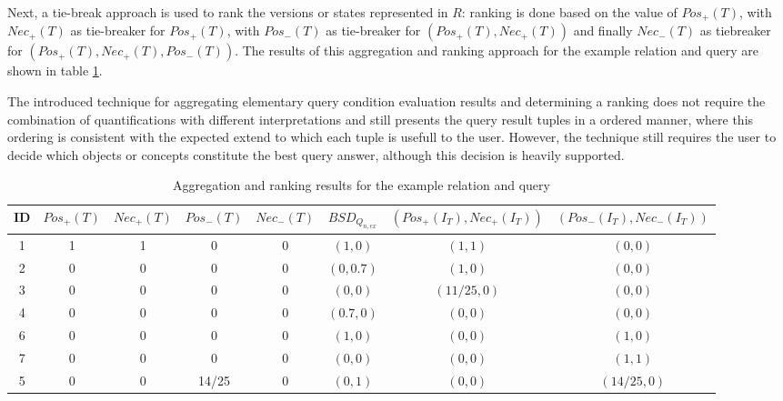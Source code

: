\documentclass[runningheads,a4paper]{llncs}
\begin{document}
Next, a tie-break approach is used to rank the versions or states represented in $R$: ranking is done based on the value of $Pos_{+}(T)$, with $Nec_{+}(T)$ as tie-breaker for $Pos_{+}(T)$, with $Pos_{-}(T)$ as tie-breaker for $(Pos_{+}(T), Nec_{+}(T))$ and finally $Nec_{-}(T)$ as tiebreaker for $(Pos_{+}(T), Nec_{+}(T), Pos_{-}(T))$. The results of this aggregation and ranking approach for the example relation and query are shown in table \ref{tab:ex-ranking}.

The introduced technique for aggregating elementary query condition evaluation results and determining a ranking does not require the combination of quantifications with different interpretations and still presents the query result tuples in a ordered manner, where this ordering is consistent with the expected extend to which each tuple is usefull to the user. However, the technique still requires the user to decide which objects or concepts constitute the best query answer, although this decision is heavily supported.

\vspace{-15pt}
\begin{table}[ht]
\caption{Aggregation and ranking results for the example relation and query}
\centering
\begin{tabular}{|c|c|c|c|c||c|c|c|}
\hline
\textbf{ID} & \textbf{$Pos_{+}(T)$} & \textbf{$Nec_{+}(T)$} & \textbf{$Pos_{-}(T)$} & \textbf{$Nec_{-}(T)$} & \textbf{$BSD_{Q_{n,ex}}$} & \textbf{$(Pos_{+}(I_T), Nec_{+}(I_T))$} & \textbf{$(Pos_{-}(I_T), Nec_{-}(I_T))$} \\
\hline
\hline
1 & 1 & 1 & 0 & 0 & $(1, 0)$ & $(1,1)$ & $(0,0)$ \\
\hline
2 & 0 & 0 & 0 & 0 & $(0, 0.7)$ & $(1,0)$ & $(0,0)$ \\
\hline
3 & 0 & 0 & 0 & 0 & $(0, 0)$ & $(11/25,0)$ & $(0,0)$ \\
\hline
4 & 0 & 0 & 0 & 0 & $(0.7, 0)$ & $(0,0)$ & $(0,0)$ \\
\hline
6 & 0 & 0 & 0 & 0 & $(1, 0)$ & $(0,0)$ & $(1,0)$ \\
\hline
7 & 0 & 0 & 0 & 0 & $(0, 0)$ & $(0,0)$ & $(1,1)$ \\
\hline
5 & 0 & 0 & 14/25 & 0 & $(0, 1)$ & $(0,0)$ & $(14/25,0)$ \\
\hline
\end{tabular}
\label{tab:ex-ranking}
\end{table}
\vspace{-20pt}
\end{document}
